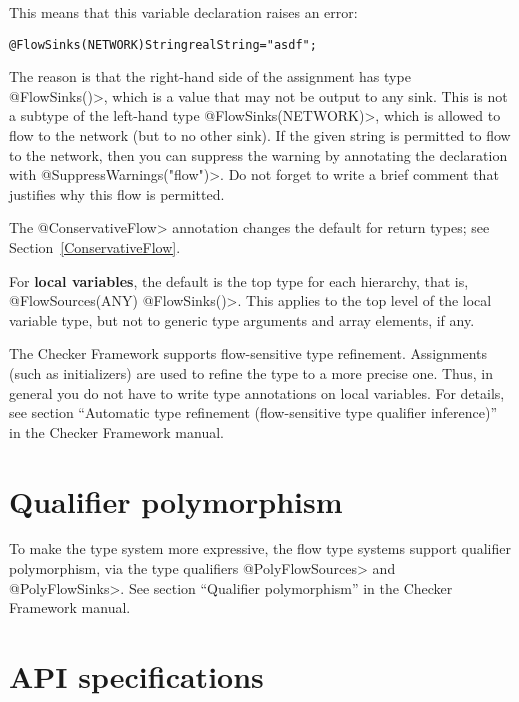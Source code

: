 This means that this variable declaration raises an error:

\begin{alltt}
@FlowSinks(NETWORK) String realString = "asdf";
\end{alltt}

The reason is that the right-hand side of the assignment has type
\<@FlowSinks({})>, which is a value that may not be output to any sink.
This is not a subtype of the left-hand type \<@FlowSinks(NETWORK)>, which
is allowed to flow to the network (but to no other sink).  If the given
string is permitted to flow to the network, then you can suppress the
warning by annotating the declaration with \<@SuppressWarnings("flow")>.
Do not forget to write a brief comment that justifies why this flow is permitted.

The \<@ConservativeFlow> annotation changes the default for return types;
see Section~\ref{ConservativeFlow}.

For \textbf{local variables}, the default is the top type for each
hierarchy, that is, \<@FlowSources(ANY) @FlowSinks({})>.  This applies to
the top level of the local variable type, but not to generic type arguments
and array elements, if any.

The Checker
Framework supports flow-sensitive type refinement.  Assignments (such as
initializers) are used to refine the type to a more precise one.  Thus, in
general you do not have to write type annotations on local variables.  For
details, see section ``Automatic type refinement (flow-sensitive type
qualifier inference)'' in the Checker Framework manual.


\section{Qualifier polymorphism}

To make the type system more expressive, the flow type systems support
qualifier polymorphism, via the type qualifiers \<@PolyFlowSources> and
\<@PolyFlowSinks>.
See section ``Qualifier polymorphism'' in the Checker Framework manual.



\section{API specifications}

